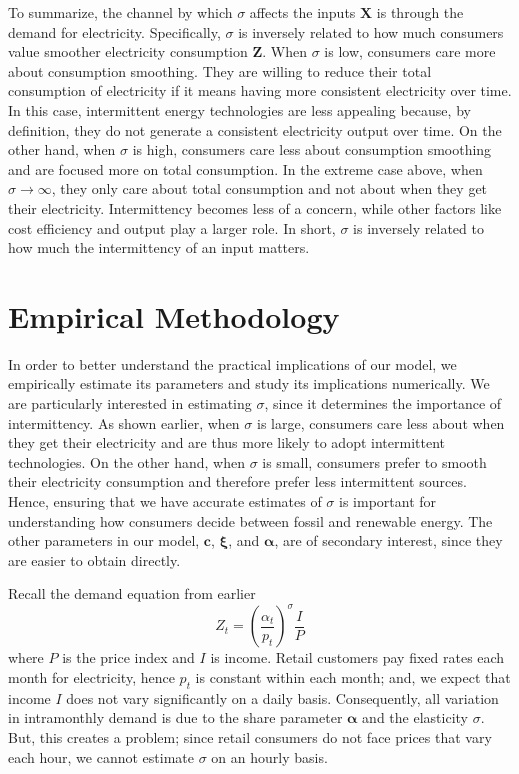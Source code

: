 \documentclass[11pt,a4paper,leqno]{extarticle}
\begin{document}
	To summarize, the channel by which $\sigma$ affects the inputs $\mathbf{X}$ is through the demand for electricity. Specifically, $\sigma$ is inversely related to how much consumers value smoother electricity consumption $\mathbf{Z}$. When $\sigma$ is low, consumers care more about consumption smoothing. They are willing to reduce their total consumption of electricity if it means having more consistent electricity over time. In this case, intermittent energy technologies are less appealing because, by definition, they do not generate a consistent electricity output over time. On the other hand, when $\sigma$ is high, consumers care less about consumption smoothing and are focused more on total consumption. In the extreme case above, when $\sigma \to \infty$, they only care about total consumption and not about when they get their electricity. Intermittency becomes less of a concern, while other factors like cost efficiency and output play a larger role. In short, $\sigma$ is inversely related to how much the intermittency of an input matters. 
	
	
	\section{Empirical Methodology}
	\label{sec:methodology}
	
	In order to better understand the practical implications of our model, we empirically estimate its parameters and study its implications numerically. We are particularly interested in estimating $\sigma$, since it determines the importance of intermittency. As shown earlier, when $\sigma$ is large, consumers care less about when they get their electricity and are thus more likely to adopt intermittent technologies. On the other hand, when $\sigma$ is small, consumers prefer to smooth their electricity consumption and therefore prefer less intermittent sources. Hence, ensuring that we have accurate estimates of $\sigma$ is important for understanding how consumers decide between fossil and renewable energy. The other parameters in our model, $\mathbf{c}$,  $\boldsymbol{\xi}$, and $\boldsymbol{\alpha}$, are of secondary interest, since they are easier to obtain directly. 
	
	Recall the demand equation from earlier
	\begin{equation}
	Z_t = \left(\frac{\alpha_t}{p_t} \right)^\sigma \frac{I}{P}
	\end{equation}
	where $P$ is the price index and $I$ is income. Retail customers pay fixed rates each month for electricity, hence $p_t$ is constant within each month; and, we expect that income $I$ does not vary significantly on a daily basis. Consequently, all variation in intramonthly demand is due to the share parameter $\boldsymbol{\alpha}$ and the elasticity $\sigma$. But, this creates a problem; since retail consumers do not face prices that vary each hour, we cannot estimate  $\sigma$ on an hourly basis. 
	
\end{document}
